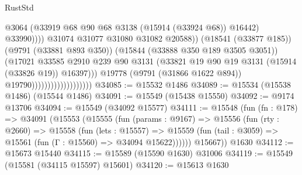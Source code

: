 \begin{lexlean}{RustStd}
\begin{coremodule}
                                                        @3064
                                                        (@33919
                                                          @68
                                                          @90
                                                          @68
                                                          @3138
                                                          (@15914 (@33924 @68))
                                                          @16442)
                                                        @33990))))
                                                @31074
                                                @31077
                                                @31080
                                                @31082
                                                @20588))
                                            (@18541 (@33877 @185))
                                            (@9791 (@33881 @893 @350))
                                            (@15844 (@33888 @350 @189 @3505 @3051))
                                            (@17021
                                              @33585
                                              @2910
                                              @239
                                              @90
                                              @3131
                                              (@33821
                                                @19
                                                @90
                                                @19
                                                @3131
                                                (@15914 (@33826 @19))
                                                @16397)))
                                          @19778
                                          (@9791 (@31866 @1622 @894))
                                          @19790)))))))))))))))))))
@34085 := @15532 @1486
@34089 := @15534 (@15538 @1486) (@15544 @1486)
@34091 := @15549 (@15438 @15550)
@34092 := @9174 @13706
@34094 := @15549 (@34092 @15577)
@34111 := @15548
    (fun (fn : @178) =>
    @34091
      (@15553
        (@15555
          (fun (params : @9167) =>
          @15556
            (fun (rty : @2660) =>
            @15558
              (fun (lets : @15557) =>
              @15559 (fun (tail : @3059) => @15561 (fun (Γ : @15560) => @34094 @15622))))))
        @15667))
    @1630
@34112 := @15673 @15440
@34115 := @15589 (@15590 @1630) @31006
@34119 := @15549 (@15581 (@34115 @15597) @15601)
@34120 := @15613 @1630

\end{coremodule}
\end{lexlean}
